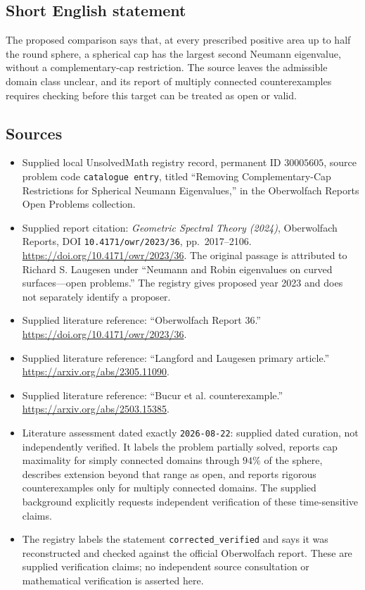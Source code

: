 \documentclass[11pt]{article}
\begin{document}
\subsection{Short English statement}
The proposed comparison says that, at every prescribed positive area up to half the round sphere, a spherical cap has the largest second Neumann eigenvalue, without a complementary-cap restriction. The source leaves the admissible domain class unclear, and its report of multiply connected counterexamples requires checking before this target can be treated as open or valid.
\subsection{Sources}
\begin{itemize}
\item Supplied local UnsolvedMath registry record, permanent ID \(30005605\), source problem code \texttt{catalogue entry}, titled ``Removing Complementary-Cap Restrictions for Spherical Neumann Eigenvalues,'' in the Oberwolfach Reports Open Problems collection.
\item Supplied report citation: \emph{Geometric Spectral Theory (2024)}, Oberwolfach Reports, DOI \texttt{10.4171/owr/2023/36}, pp.~2017--2106. \url{https://doi.org/10.4171/owr/2023/36}. The original passage is attributed to Richard S. Laugesen under ``Neumann and Robin eigenvalues on curved surfaces---open problems.'' The registry gives proposed year 2023 and does not separately identify a proposer.
\item Supplied literature reference: ``Oberwolfach Report 36.'' \url{https://doi.org/10.4171/owr/2023/36}.
\item Supplied literature reference: ``Langford and Laugesen primary article.'' \url{https://arxiv.org/abs/2305.11090}.
\item Supplied literature reference: ``Bucur et al. counterexample.'' \url{https://arxiv.org/abs/2503.15385}.
\item Literature assessment dated exactly \texttt{2026-08-22}: supplied dated curation, not independently verified. It labels the problem partially solved, reports cap maximality for simply connected domains through \(94\%\) of the sphere, describes extension beyond that range as open, and reports rigorous counterexamples only for multiply connected domains. The supplied background explicitly requests independent verification of these time-sensitive claims.
\item The registry labels the statement \texttt{corrected\_verified} and says it was reconstructed and checked against the official Oberwolfach report. These are supplied verification claims; no independent source consultation or mathematical verification is asserted here.
\end{itemize}
\end{document}
